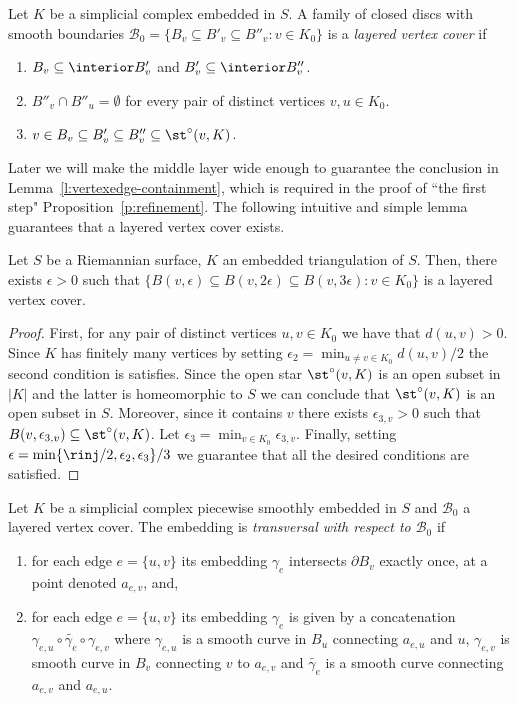 %
\begin{definition}
    Let $K$ be a simplicial complex embedded in $S$. A family of closed discs with smooth boundaries $\mathcal{B}_0 = \{B_v \subseteq B'_v \subseteq B''_v \colon v\in K_0 \}$ is a \emph{layered vertex cover} if 
    \begin{enumerate}
        \item $B_v\subseteq \interior B'_v$ and $B'_v\subseteq \interior B''_v$.
        \item $B''_v\cap B''_u = \emptyset$ for every pair of distinct vertices $v,u\in K_0$.
        \item $v \in B_v\subseteq B'_v\subseteq B_v'' \subseteq \st^\circ(v,K)$.
    \end{enumerate}
\end{definition}
Later we will make the middle layer wide enough to guarantee the conclusion in Lemma~\ref{l:vertexedge-containment}, which is required in the proof of ``the first step" Proposition~\ref{p:refinement}.
%
The following intuitive and simple lemma guarantees that a layered vertex cover exists. 
\begin{lemma}
\label{l:vertexdisc}
Let $S$ be a Riemannian surface, $K$ an embedded triangulation of $S$. Then, there exists $\epsilon>0$ such that $\{B(v,\epsilon)\subseteq B(v,2\epsilon) \subseteq B(v,3\epsilon) \colon v\in K_0 \}$ is a layered vertex cover.
\end{lemma}
\begin{proof}    
    First, for any pair of distinct vertices $u,v\in K_0$ we have that $d(u,v)>0$. Since $K$ has finitely many vertices by setting $\epsilon_2 = \min_{u\neq v\in K_0}d(u,v)/2$ the second condition is satisfies.
%
    Since the open star $\st^\circ(v,K)$ is an open subset in $|K|$ and the latter is homeomorphic to $S$ we can conclude that $\st^\circ(v,K)$ is an open subset in $S$. Moreover, since it contains $v$ there exists $\epsilon_{3,v}>0$ such that $B(v,\epsilon_{3,v})\subseteq \st^\circ(v,K)$.
    Let $\epsilon_3=\min_{v\in K_0} \epsilon_{3,v}$.
%
    Finally, setting $\epsilon=\min\{\rinj/2,\epsilon_2,\epsilon_3\}/3$ we guarantee that all the desired conditions are satisfied.
\end{proof}
%
\begin{definition}
    Let $K$ be a simplicial complex piecewise smoothly embedded in $S$ and $\mathcal{B}_0$ a layered vertex cover. The embedding is \emph{transversal with respect to $\mathcal{B}_0$} if
    \begin{enumerate}
        \item for each edge $e=\{u,v\}$ its embedding $\gamma_e$ intersects $\partial B_v$ exactly once, at a point denoted $a_{e,v}$, and, 
        \item for each edge $e=\{u,v\}$ its embedding $\gamma_e$ is given by a concatenation $\gamma_{e,u}\circ \widetilde{\gamma_e}\circ \gamma_{e,v}$ where $\gamma_{e,u}$ is a smooth curve in $B_u$ connecting $a_{e,u}$ and $u$, $\gamma_{e,v}$ is smooth curve in $B_v$ connecting $v$ to $a_{e,v}$ and $\widetilde{\gamma_e}$ is a smooth curve connecting $a_{e,v}$ and $a_{e,u}$.
    \end{enumerate}
\end{definition}
